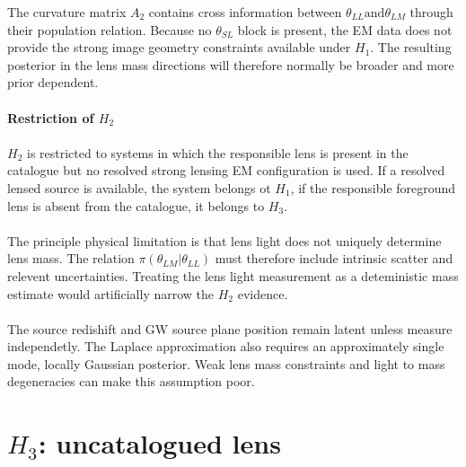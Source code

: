 \documentclass[pdflatex,sn-mathphys-num]{sn-jnl}%
\theoremstyle{thmstyleone}%
\theoremstyle{thmstyletwo}%
\theoremstyle{thmstylethree}%
\begin{document}
\begin{appendices}
The curvature matrix $A_2$ contains cross information between $\theta_{LL} \text{and} \theta_{LM}$ through their population relation.
Because no $\theta_{SL}$ block is present, the EM data does not provide the strong image geometry constraints available under $H_1$.
The resulting posterior in the lens mass directions will therefore normally be broader and more prior dependent.\\
\\
\textbf{Restriction of $H_2$}\\
\\
$H_2$ is restricted to systems in which the responsible lens is present in the catalogue but no resolved strong lensing EM configuration is used.
If a resolved lensed source is available, the system belongs ot $H_1$, if the responsible foreground lens is absent from the catalogue, it belongs to $H_3$.\\
\\
The principle physical limitation is that lens light does not uniquely determine lens mass.
The relation $\pi(\theta_{LM}|\theta_{LL})$ must therefore include intrinsic scatter and relevent uncertainties.
Treating the lens light measurement as a deteministic mass estimate would artificially narrow the $H_2$ evidence.\\
\\
The source redishift and GW source plane position remain latent unless measure independetly.
The Laplace approximation also requires an approximately single mode, locally Gaussian posterior.
Weak lens mass constraints and light to mass degeneracies can make this assumption poor.

\section{$H_3$: uncatalogued lens}


\end{appendices}
\end{document}
